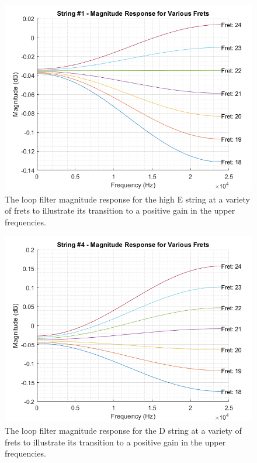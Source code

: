 \documentclass[../main.tex]{subfiles}
\begin{document}
\begin{figure}[h]
    \centering
    \includegraphics[scale=.65]{./images/plots/Unstable Loop Filter - String 1.png}
    \caption{The loop filter magnitude response for the high E string at a variety of frets to illustrate its transition to a positive gain in the upper frequencies.}
    \label{fig:UnstableLoopString1}
\end{figure}

\begin{figure}[h]
    \centering
    \includegraphics[scale=.65]{./images/plots/Unstable Loop Filter - String 4.png}
    \caption{The loop filter magnitude response for the D string at a variety of frets to illustrate its transition to a positive gain in the upper frequencies.}
    \label{fig:UnstableLoopString4}
\end{figure}
\end{document}
